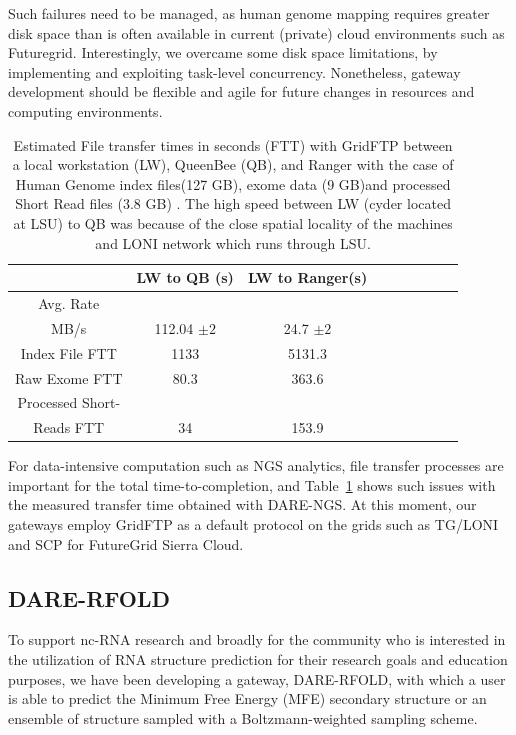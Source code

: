 \documentclass{sig-alternate}
\begin{document}
Such failures need to be managed, as human genome mapping requires
greater disk space than is often available in current (private) cloud
environments such as Futuregrid. Interestingly, we overcame some disk
space limitations, by implementing and exploiting task-level
concurrency. Nonetheless, gateway development should be flexible and
agile for future changes in resources and computing environments.

 \begin{table}
 \small
 \begin{tabular}{|c|c|c|c|c|c|c|c|c|} 
 \hline  
 	          & LW to QB (s)  & LW to Ranger(s) \\
 \hline                       
Avg. Rate && \\
MB/s & 112.04 $\pm 2$ &	    24.7 $\pm 2$  \\
 \hline                       
Index File	FTT & 1133  &	    5131.3      \\        
 \hline                       
Raw 	 Exome FTT&80.3 & 363.6\\                  
 \hline                       
Processed Short-&    & \\
Reads FTT&34&153.9  \\
 \hline                       
                    
\end{tabular}


\caption{Estimated File transfer times in seconds (FTT) with GridFTP between a local workstation (LW), QueenBee (QB), and Ranger with the case of Human Genome index files(127 GB), exome data (9 GB)and processed Short Read files (3.8 GB) . The high speed between LW (cyder located at LSU) to QB was because of the close spatial locality of the machines and LONI network which runs through LSU.   }

 \label{table:NGS-Distributed-file} 
\end{table}

For data-intensive computation such as NGS analytics, file transfer
processes are important for the total time-to-completion, and
Table~\ref{table:NGS-Distributed-file} shows such issues with the
measured transfer time obtained with DARE-NGS.  At this moment, our
gateways employ GridFTP as a default protocol on the grids such as
TG/LONI and SCP for FutureGrid Sierra Cloud.

\subsection{DARE-RFOLD}
To support nc-RNA research and broadly for the community who is
interested in the utilization of RNA structure prediction for their
research goals and education purposes, we have been developing a
gateway, DARE-RFOLD, with which a user is able to predict the Minimum
Free Energy (MFE) secondary structure or an ensemble of structure
sampled with a Boltzmann-weighted sampling scheme.
\end{document}
